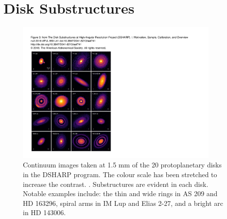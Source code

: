 
\section{Disk Substructures}

\begin{figure}
    \centering
    \includegraphics[width = 0.9\textwidth]{figures/DSHARP.pdf}
    \caption{Continuum images taken at 1.5 mm of the 20 protoplanetary disks in the DSHARP program. The colour scale has been stretched to increase the contrast. \citep{andrews2018}. Substructures are evident in each disk. Notable examples include: the thin and wide rings in AS 209 and HD 163296, spiral arms in IM Lup and Elias 2-27, and a bright arc in HD 143006.}
    \label{fig:DSHARP}
\end{figure}

